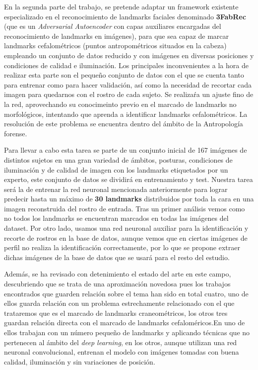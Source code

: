 \medskip

\noindent En la segunda parte del trabajo, se pretende adaptar un framework existente especializado en el reconocimiento de landmarks faciales denominado \textbf{3FabRec} (que es un \textit{Adversarial Autoencoder} con capas auxiliares encargadas del reconocimiento de landmarks en imágenes), para que sea capaz de marcar landmarks cefalométricos (puntos antropométricos situados en la cabeza) empleando un conjunto de datos reducido y con imágenes en diversas posiciones y condiciones de calidad e iluminación. Los principales inconvenientes a la hora de realizar esta parte son el pequeño conjunto de datos con el que se cuenta tanto para entrenar como para hacer validación, así como la necesidad de recortar cada imagen para quedarnos con el rostro de cada sujeto. Se realizaŕa un ajuste fino de la red, aprovechando su conocimeinto previo en el marcado de landmarks no morfológicos, intentando que aprenda a identificar landmarks cefalométricos. La resolución de este problema se encuentra dentro del ámbito de la Antropología forense.

\medskip

\noindent Para llevar a cabo esta tarea se parte de un conjunto inicial de 167 imágenes de distintos sujetos en una gran variedad de ámbitos, posturas, condiciones de iluminación y de calidad de imagen con los landmarks etiquetados por un experto, este conjunto de datos se dividirá en entrenamiento y test. Nuestra tarea será la de entrenar la red neuronal mencionada anteriormente para lograr predecir hasta un máximo de \textbf{30 landmarks} distribuidos por toda la cara en una imagen reconstruida del rostro de entrada. Tras un primer análisis vemos como no todos los landmarks se encuentran marcados en todas las imágenes del dataset. Por otro lado, usamos una red neuronal auxiliar para la identificación y recorte de rostros en la base de datos, aunque vemos que en ciertas imágenes de perfil no realiza la identificación correctamente, por lo que se propone extraer dichas imágenes de la base de datos que se usará para el resto del estudio. 

\medskip

\noindent Además, se ha revisado con detenimiento el estado del arte en este campo, descubriendo que se trata de una aproximación novedosa pues los trabajos encontrados que guarden relación sobre el tema han sido en total cuatro, uno de ellos guarda relación con un problema estrechamente relacionado con el que trataremos que es el marcado de landmarks craneométricos, los otros tres guardan relación directa con el marcado de landmarks cefaloméricos.En uno de ellos trabajan con un número pequeño de landmarks y aplicando técnicas que no pertenecen al ámbito del \textit{deep learning}, en los otros, aunque utilizan una red neuronal convolucional, entrenan el modelo con imágenes tomadas con buena calidad, iluminación y sin variaciones de posición.

